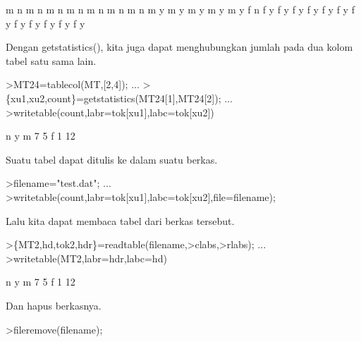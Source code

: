\documentclass[a4paper,10pt]{article}
\begin{document}
\begin{eulernotebook}
\begin{euleroutput}
           m         n
           m         n
           m         n
           m         n
           m         n
           m         n
           m         n
           m         y
           m         y
           m         y
           m         y
           m         y
           f         n
           f         y
           f         y
           f         y
           f         y
           f         y
           f         y
           f         y
           f         y
           f         y
           f         y
           f         y
           f         y
\end{euleroutput}
\begin{eulercomment}
Dengan getstatistics(), kita juga dapat menghubungkan jumlah pada dua
kolom tabel satu sama lain.
\end{eulercomment}
\begin{eulerprompt}
>MT24=tablecol(MT,[2,4]); ...
>\{xu1,xu2,count\}=getstatistics(MT24[1],MT24[2]); ...
>writetable(count,labr=tok[xu1],labc=tok[xu2])
\end{eulerprompt}
\begin{euleroutput}
                     n         y
           m         7         5
           f         1        12
\end{euleroutput}
\begin{eulercomment}
Suatu tabel dapat ditulis ke dalam suatu berkas.
\end{eulercomment}
\begin{eulerprompt}
>filename="test.dat"; ...
>writetable(count,labr=tok[xu1],labc=tok[xu2],file=filename);
\end{eulerprompt}
\begin{eulercomment}
Lalu kita dapat membaca tabel dari berkas tersebut.
\end{eulercomment}
\begin{eulerprompt}
>\{MT2,hd,tok2,hdr\}=readtable(filename,>clabs,>rlabs); ...
>writetable(MT2,labr=hdr,labc=hd)
\end{eulerprompt}
\begin{euleroutput}
                     n         y
           m         7         5
           f         1        12
\end{euleroutput}
\begin{eulercomment}
Dan hapus berkasnya.
\end{eulercomment}
\begin{eulerprompt}
>fileremove(filename);
\end{eulerprompt}

\end{eulernotebook}
\end{document}
